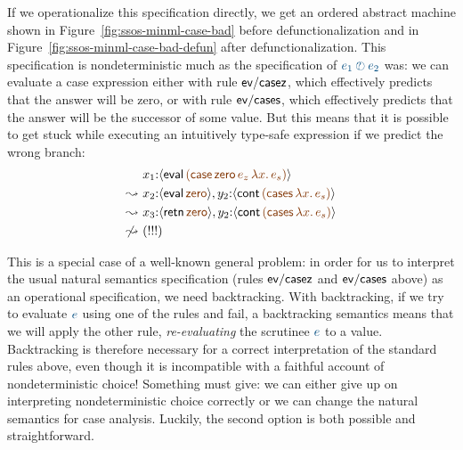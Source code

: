 If we operationalize this specification directly, we get an
ordered abstract machine shown in Figure~\ref{fig:ssos-minml-case-bad}
before defunctionalization and in
Figure~\ref{fig:ssos-minml-case-bad-defun} after defunctionalization.
This specification is nondeterministic much as the specification of
$\obj{e_1 \arb e_2}$ was: we can evaluate a case expression either
with rule ${\sf ev/casez}$, which effectively predicts that the answer
will be zero, or with rule ${\sf ev/cases}$, which effectively predicts
that the answer will be the successor of some value. But this means that
it is possible to get stuck while executing 
an intuitively type-safe expression if we predict the wrong branch:
\begin{align*}
 & x_1{:}\susp{{\sf eval}\,\lf{({\sf case}\,{\sf zero}\,e_z\,\lambda x.\,e_s)}}
\\
\leadsto ~ & 
x_2{:}\susp{{\sf eval}\,\lf{\sf zero}},
y_2{:}\susp{{\sf cont}\,\lf{({\sf cases}\,\lambda x.\,e_s)}}
\\
\leadsto ~ & 
x_3{:}\susp{{\sf retn}\,\lf{\sf zero}},
y_2{:}\susp{{\sf cont}\,\lf{({\sf cases}\,\lambda x.\,e_s)}}
\\
\not\leadsto ~ & (!!!)
\end{align*}

This is a special case of a well-known general problem: in
order for us to interpret the usual natural semantics specification
(rules ${\sf ev/casez}$ and ${\sf ev/cases}$ above) as an operational
specification, we need backtracking. With backtracking, if we try to
evaluate $\obj{e}$ using one of the rules and fail, a backtracking
semantics means that we will apply the other rule, {\it re-evaluating}
the scrutinee $\obj{e}$ to a value. Backtracking is therefore
necessary for a correct interpretation of the standard rules above,
even though it is incompatible with a faithful account of
nondeterministic choice!  Something must give: we can either give up
on interpreting nondeterministic choice correctly or we can change the
natural semantics for case analysis. Luckily, the second option is both
possible and straightforward.

